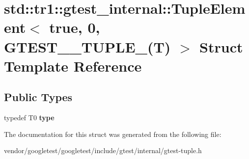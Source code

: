 \hypertarget{structstd_1_1tr1_1_1gtest__internal_1_1TupleElement_3_01true_00_010_00_01GTEST__10__TUPLE___07T_08_01_4}{}\section{std\+:\+:tr1\+:\+:gtest\+\_\+internal\+:\+:Tuple\+Element$<$ true, 0, G\+T\+E\+S\+T\+\_\+\_\+\+T\+U\+P\+L\+E\+\_\+(T) $>$ Struct Template Reference}
\label{structstd_1_1tr1_1_1gtest__internal_1_1TupleElement_3_01true_00_010_00_01GTEST__10__TUPLE___07T_08_01_4}
\subsection*{Public Types}
\begin{DoxyCompactItemize}
\item 
typedef T0 {\bfseries type}\hypertarget{structstd_1_1tr1_1_1gtest__internal_1_1TupleElement_3_01true_00_010_00_01GTEST__10__TUPLE___07T_08_01_4_a9884837daf9c541890f3bce26e90981b}{}\label{structstd_1_1tr1_1_1gtest__internal_1_1TupleElement_3_01true_00_010_00_01GTEST__10__TUPLE___07T_08_01_4_a9884837daf9c541890f3bce26e90981b}

\end{DoxyCompactItemize}


The documentation for this struct was generated from the following file\+:\begin{DoxyCompactItemize}
\item 
vendor/googletest/googletest/include/gtest/internal/gtest-\/tuple.\+h\end{DoxyCompactItemize}

